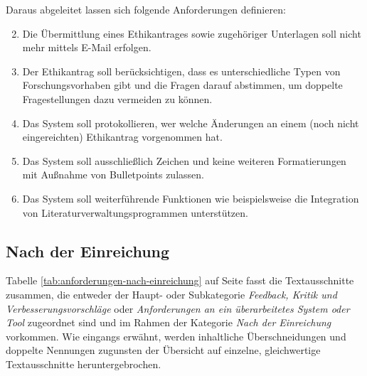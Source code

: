 \documentclass[a4paper,12pt,twoside]{scrreprt}
\begin{document}
Daraus abgeleitet lassen sich folgende Anforderungen definieren:
\begin{enumerate}[label=\textbf{\#\arabic*}]
    \setcounter{enumi}{1}
    \item Die Übermittlung eines Ethikantrages sowie zugehöriger Unterlagen soll nicht mehr mittels E-Mail erfolgen.
    \item Der Ethikantrag soll berücksichtigen, dass es unterschiedliche Typen von Forschungsvorhaben gibt und die Fragen darauf abstimmen, um doppelte Fragestellungen dazu vermeiden zu können.
    \item Das System soll protokollieren, wer welche Änderungen an einem (noch nicht eingereichten) Ethikantrag vorgenommen hat.
    \item Das System soll ausschließlich Zeichen und keine weiteren Formatierungen mit Außnahme von Bulletpoints zulassen.
    \item Das System soll weiterführende Funktionen wie beispielsweise die Integration von Literaturverwaltungsprogrammen unterstützen.
\end{enumerate}

\subsection{Nach der Einreichung}
\label{sub-sec:nach-einreichung}

Tabelle \ref{tab:anforderungen-nach-einreichung} auf Seite \pageref{tab:anforderungen-nach-einreichung} fasst die Textausschnitte zusammen, die entweder der Haupt- oder Subkategorie \textit{Feedback, Kritik und Verbesserungsvorschläge} oder \textit{Anforderungen an ein überarbeitetes System oder Tool} zugeordnet sind und im Rahmen der Kategorie \textit{Nach der Einreichung} vorkommen. Wie eingangs erwähnt, werden inhaltliche Überschneidungen und doppelte Nennungen zugunsten der Übersicht auf einzelne, gleichwertige Textausschnitte heruntergebrochen.
\end{document}
